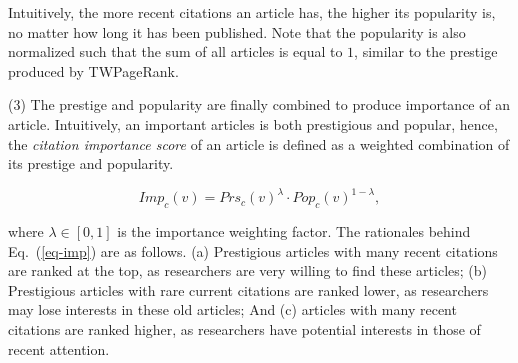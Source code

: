 
Intuitively, the more recent citations an article has, the higher its popularity is, no matter how long it has been published.
%
%
Note that the popularity is also normalized such that the sum of  all articles is equal to $1$, similar to the prestige produced by TWPageRank.

\sstab(3) The prestige and popularity are finally combined to produce importance of an article. Intuitively, an important articles is both prestigious and popular, hence, the {\em citation importance score} of an article is defined as a weighted combination of its prestige and popularity.

\vspace{-2ex}
\begin{small}
\begin{equation}\label{eq-imp}
Imp_c(v) = Prs_c(v)^\lambda \cdot Pop_c(v)^{1-\lambda},
\end{equation}
\end{small}
\noindent where $\lambda \in [0,1]$ is the importance weighting factor.
The rationales behind Eq.~(\ref{eq-imp}) are as follows. (a) Prestigious articles with many recent citations are ranked at the top, as researchers are very willing to find these articles; (b) Prestigious articles with rare current citations are ranked lower, as researchers may lose interests in these old articles; And (c) articles with many recent citations are ranked higher, as researchers have potential interests in those of recent attention.



